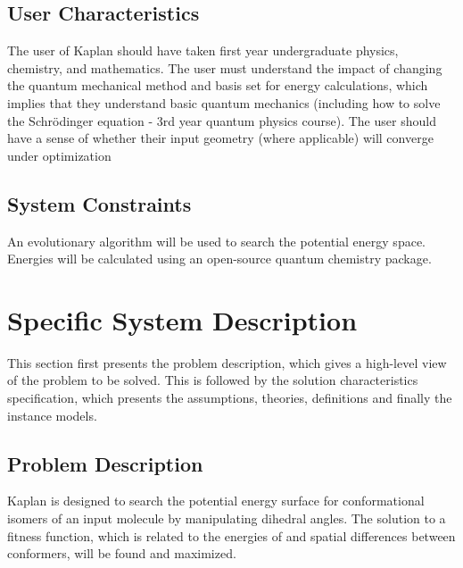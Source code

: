 \documentclass[12pt]{article}
\newcommand{\progname}{Kaplan} %
\begin{document}
\subsection{User Characteristics} \label{SecUserCharacteristics}

The user of \progname{} should have taken first year undergraduate physics, 
chemistry, and mathematics. The user must understand the 
impact of changing the quantum mechanical method and basis set for energy 
calculations, which implies that they understand basic quantum mechanics 
(including how to solve the Schr\"{o}dinger equation - 3rd year quantum physics 
course). The user should have a sense of whether their input geometry (where 
applicable) will converge under optimization


\subsection{System Constraints}

An evolutionary algorithm will be used to search the potential energy space. 
Energies will be calculated using an open-source quantum chemistry package.

\section{Specific System Description}

This section first presents the problem description, which gives a high-level
view of the problem to be solved.  This is followed by the solution 
characteristics
specification, which presents the assumptions, theories, definitions and finally
the instance models.  

\subsection{Problem Description} \label{Sec_pd}


\progname{} is designed to search the potential energy surface for 
conformational isomers of an input molecule by manipulating dihedral angles. 
The solution to a fitness function, which is related to the energies of and 
spatial differences between conformers, will be found and maximized.
\end{document}
